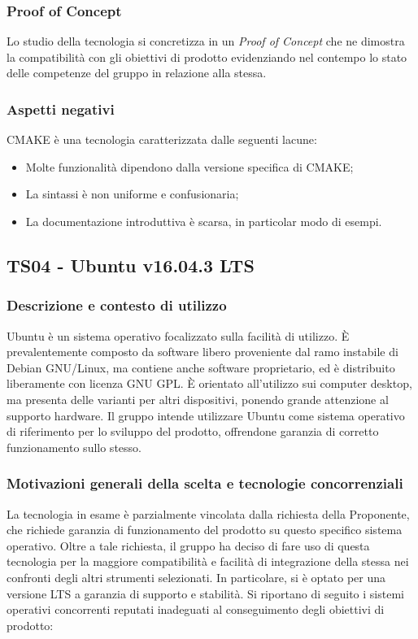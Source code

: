 \documentclass[./../Technology Baseline.tex]{subfiles}
\begin{document}
\subsubsection{Proof of Concept}
Lo studio della tecnologia si concretizza in un \textit{Proof of Concept} che ne dimostra la compatibilità con gli obiettivi di prodotto evidenziando nel contempo lo stato delle competenze del gruppo in relazione alla stessa.

\subsubsection{Aspetti negativi}
CMAKE è una tecnologia caratterizzata dalle seguenti lacune:
\begin{itemize}
	\item Molte funzionalità dipendono dalla versione specifica di CMAKE;
	\item La sintassi è non uniforme e confusionaria;
	\item La documentazione introduttiva è scarsa, in particolar modo di esempi.
\end{itemize}

\subsection{TS04 - Ubuntu v16.04.3 LTS}

\subsubsection{Descrizione e contesto di utilizzo}
Ubuntu è un sistema operativo focalizzato sulla facilità di utilizzo. È prevalentemente composto da software libero proveniente dal ramo instabile di Debian GNU/Linux, ma contiene anche software proprietario, ed è distribuito liberamente con licenza GNU GPL. È orientato all'utilizzo sui computer desktop, ma presenta delle varianti per altri dispositivi, ponendo grande attenzione al supporto hardware. Il gruppo intende utilizzare Ubuntu come sistema operativo di riferimento per lo sviluppo del prodotto, offrendone garanzia di corretto funzionamento sullo stesso.

\subsubsection{Motivazioni generali della scelta e tecnologie concorrenziali}
La tecnologia in esame è parzialmente vincolata dalla richiesta della Proponente, che richiede garanzia di funzionamento del prodotto su questo specifico sistema operativo. Oltre a tale richiesta, il gruppo ha deciso di fare uso di questa tecnologia per la maggiore compatibilità e facilità di integrazione della stessa nei confronti degli altri strumenti selezionati. In particolare, si è optato per una versione LTS a garanzia di supporto e stabilità. Si riportano di seguito i sistemi operativi concorrenti reputati inadeguati al conseguimento degli obiettivi di prodotto:
\end{document}
